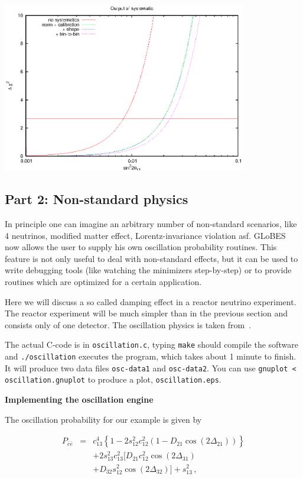 \documentclass[12pt,a4paper]{article}
\newcommand{\aufg}[1]{\vspace{4mm}{\bf\underline{Problem #1:}}\vspace{3mm}}
\begin{document}
\begin{center}
\includegraphics[width=0.8\textwidth]{systematic}
\end{center}

\subsection*{Part 2: Non-standard physics}

In principle one can imagine an arbitrary number of non-standard
scenarios, like 4 neutrinos, modified matter effect,
Lorentz-invariance violation asf. GLoBES now allows the user to supply
his own oscillation probability routines. This feature is not only
useful to deal with non-standard effects, but it can be used to write
debugging  tools (like watching the minimizers step-by-step) or to
provide routines which are optimized for a certain application.

Here we will discuss a so called damping effect in a reactor neutrino
experiment. The reactor experiment will be much simpler than in the
previous section and consists only of one detector. The oscillation
physics is taken from~\cite{Blennow:2005yk}.

The actual C-code is in {\tt oscillation.c}, typing {\tt make} should
compile the software and {\tt ./oscillation} executes the program,
which takes about 1 minute to finish. It will produce two data files
{\tt osc-data1} and {\tt osc-data2}. You can use {\tt gnuplot <
  oscillation.gnuplot} to produce a plot, {\tt oscillation.eps}.


\aufg{1} {\bf Implementing the oscillation engine}

The oscillation probability for our example is given by

\begin{eqnarray}
P_{\bar e\bar e} &=&
c_{13}^4 \left\{ 1-2 s_{12}^2 c_{12}^2 ( 1-D_{21}\cos(2\Delta_{21}))
  \right\}\nonumber\\
&&+2 s_{13}^2 c_{13}^2 [D_{21} c_{12}^2 \cos(2\Delta_{31})\nonumber\\
&&+D_{32}s_{12}^2\cos(2\Delta_{32})] + s_{13}^2 
\,,
\end{eqnarray}
\end{document}
